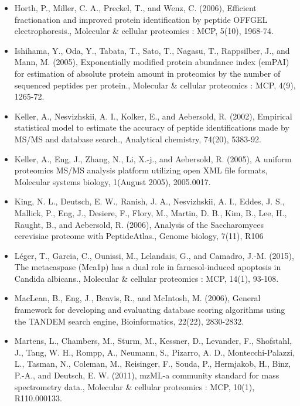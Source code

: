 \begin{itemize}
\item[]{%
Horth, P., Miller, C. A., Preckel, T., and Wenz, C. (2006), Efficient fractionation and improved
protein identification by peptide OFFGEL electrophoresis., Molecular \& cellular proteomics
: MCP, 5(10), 1968-74.
}

\item[]{%
Ishihama, Y., Oda, Y., Tabata, T., Sato, T., Nagasu, T., Rappsilber, J., and Mann, M. (2005),
Exponentially modified protein abundance index (emPAI) for estimation of absolute protein
amount in proteomics by the number of sequenced peptides per protein., 
Molecular \& cellular proteomics : MCP, 4(9), 1265-72.
}

\item[]{%
Keller, A., Nesvizhskii, A. I., Kolker, E., and Aebersold, R. (2002), Empirical statistical model
to estimate the accuracy of peptide identifications made by MS/MS and database search.,
Analytical chemistry, 74(20), 5383-92.
}

\item[]{%
Keller, A., Eng, J., Zhang, N., Li, X.-j., and Aebersold, R. (2005), A uniform proteomics MS/MS
analysis platform utilizing open XML file formats, Molecular systems biology, 1(August
2005), 2005.0017.
}

\item[]{%
King, N. L., Deutsch, E. W., Ranish, J. A., Nesvizhskii, A. I., Eddes, J. S., Mallick, P., Eng, J.,
Desiere, F., Flory, M., Martin, D. B., Kim, B., Lee, H., Raught, B., and Aebersold, R. (2006),
Analysis of the Saccharomyces cerevisiae proteome with PeptideAtlas., Genome biology,
7(11), R106
}

\item[]{%
L\'eger, T., Garcia, C., Ounissi, M., Lelandais, G., and Camadro, J.-M. (2015), 
The metacaspase (Mca1p) has a dual role in farnesol-induced apoptosis in Candida albicans.,
Molecular \& cellular proteomics : MCP, 14(1), 93-108.}


\item[]{%
MacLean, B., Eng, J., Beavis, R., and McIntosh, M. (2006), General framework for developing
and evaluating database scoring algorithms using the TANDEM search engine, 
Bioinformatics, 22(22), 2830-2832.
}

\item[]{%
Martens, L., Chambers, M., Sturm, M., Kessner, D., Levander, F., Shofstahl, J., Tang, W. H.,
Rompp, A., Neumann, S., Pizarro, A. D., Montecchi-Palazzi, L., Tasman, N., Coleman, M.,
Reisinger, F., Souda, P., Hermjakob, H., Binz, P.-A., and Deutsch, E. W. (2011), mzML-a
community standard for mass spectrometry data., Molecular \& cellular proteomics : MCP,
10(1), R110.000133.
}


\end{itemize}
